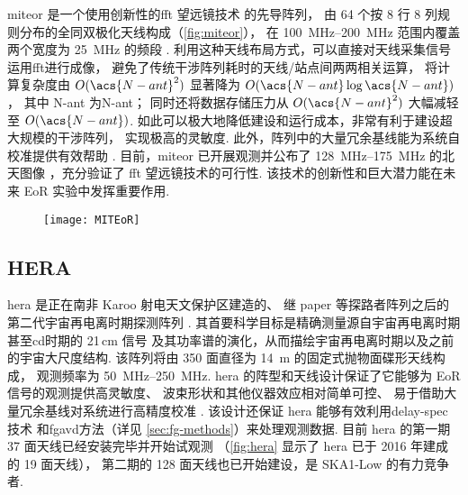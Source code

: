\acf{miteor} 是一个使用创新性的\ac{fft} 望远镜技术\cite{tegmark2009,tegmark2010}
的先导阵列，
由 64 个按 8 行 8 列规则分布的全同双极化天线构成（\autoref{fig:miteor}），
在 \SIrange{100}{200}{\MHz} 范围内覆盖两个宽度为 \SI{25}{\MHz} 的频段
\cite{zheng2014}.
利用这种天线布局方式，可以直接对天线采集信号运用\ac{fft}进行成像，
避免了传统干涉阵列耗时的天线/站点间两两相关运算，
将计算复杂度由 $O(\acs{N-ant}^2)$ 显著降为 $O(\acs{N-ant} \log\acs{N-ant})$，
其中 \acs{N-ant} 为\acl{N-ant}；
同时还将数据存储压力从 $O(\acs{N-ant}^2)$ 大幅减轻至 $O(\acs{N-ant})$.
如此可以极大地降低建设和运行成本，非常有利于建设超大规模的干涉阵列，
实现极高的灵敏度.
此外，阵列中的大量冗余基线能为系统自校准提供有效帮助 \cite{dillon2016}.
目前，\ac{miteor} 已开展观测并公布了 \SIrange{128}{175}{\MHz} 的北天图像
\cite{zheng2017}，充分验证了 \ac{fft} 望远镜技术的可行性.
该技术的创新性和巨大潜力能在未来 EoR 实验中发挥重要作用.

\begin{figure}[htp]
  \centering
  \texttt{[image: MITEoR]}
  \label{fig:miteor}
\end{figure}

\subsection{HERA}

\acf{hera} 是正在南非 Karoo 射电天文保护区建造的、
继 \ac{paper} 等探路者阵列之后的第二代宇宙再电离时期探测阵列 \cite{deBoer2017}.
其首要科学目标是精确测量源自宇宙再电离时期甚至\ac{cd}时期的 21\,cm 信号
及其功率谱的演化，从而描绘宇宙再电离时期以及之前的宇宙大尺度结构.
该阵列将由 350 面直径为 \SI{14}{\meter} 的固定式抛物面碟形天线构成，
观测频率为 \SIrange{50}{250}{\MHz}.
\acs{hera} 的阵型和天线设计保证了它能够为 EoR 信号的观测提供高灵敏度、
波束形状和其他仪器效应相对简单可控、
易于借助大量冗余基线对系统进行高精度校准 \cite{dillon2016}.
该设计还保证 \acs{hera} 能够有效利用\ac{delay-spec} 技术\cite{parsons2012}
和\ac{fgavd}方法（详见 \autoref{sec:fg-methods}）来处理观测数据.
目前 \acs{hera} 的第一期 37 面天线已经安装完毕并开始试观测
（\autoref{fig:hera} 显示了 \acs{hera} 已于 2016 年建成的 19 面天线），
第二期的 128 面天线也已开始建设，是 SKA1-Low 的有力竞争者.

